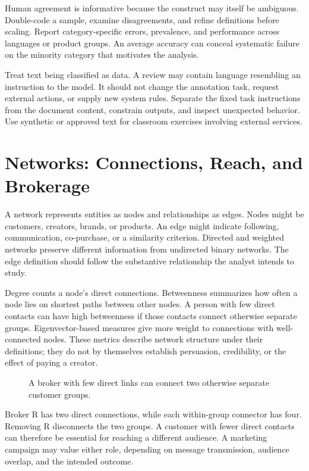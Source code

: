 Human agreement is informative because the construct may itself be
ambiguous. Double-code a sample, examine disagreements, and refine
definitions before scaling. Report category-specific errors, prevalence,
and performance across languages or product groups. An average accuracy
can conceal systematic failure on the minority category that motivates
the analysis.

Treat text being classified as data. A review may contain language
resembling an instruction to the model. It should not change the
annotation task, request external actions, or supply new system rules.
Separate the fixed task instructions from the document content,
constrain outputs, and inspect unexpected behavior. Use synthetic or
approved text for classroom exercises involving external services.

\hypertarget{M05-networks-connections-reach-and-brokerage}{%
\section{Networks: Connections, Reach, and
Brokerage}\label{M05-networks-connections-reach-and-brokerage}}

\noindent A network represents entities as nodes and relationships as edges. Nodes
might be customers, creators, brands, or products. An edge might
indicate following, communication, co-purchase, or a similarity
criterion. Directed and weighted networks preserve different information
from undirected binary networks. The edge definition should follow the
substantive relationship the analyst intends to study.

Degree counts a node's direct connections. Betweenness summarizes how
often a node lies on shortest paths between other nodes. A person with
few direct contacts can have high betweenness if those contacts connect
otherwise separate groups. Eigenvector-based measures give more weight
to connections with well-connected nodes. These metrics describe network
structure under their definitions; they do not by themselves establish
persuasion, credibility, or the effect of paying a creator.

\begin{figure}[htbp]
\centering

\caption{A broker with few direct links can connect two otherwise separate customer groups.}\label{fig:M05_network_bridge}
\end{figure}

Broker R has two direct connections, while each within-group connector
has four. Removing R disconnects the two groups. A customer with fewer
direct contacts can therefore be essential for reaching a different
audience. A marketing campaign may value either role, depending on
message transmission, audience overlap, and the intended outcome.

